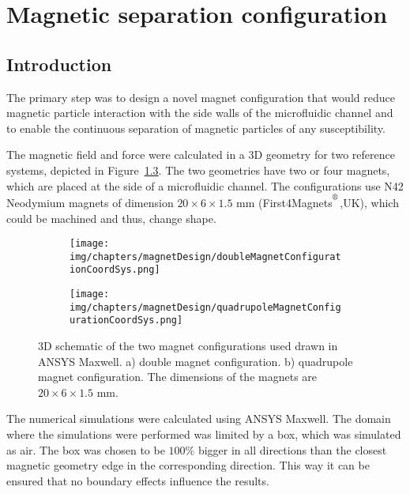 \chapter{Magnetic separation configuration}\label{ch:magneticSeparationConfiguration}

\section{Introduction}\label{sec:introduction}
The primary step was to design a novel magnet configuration that would reduce magnetic particle interaction with the side walls of the microfluidic channel and to enable the continuous separation of magnetic particles of any susceptibility. 

The magnetic field and force were calculated in a 3D geometry for two reference systems, depicted in Figure~\ref{fig:magnetConfigurations}. The two  geometries have two or four magnets, which are placed at the side of a microfluidic channel. The configurations use N42 Neodymium magnets of dimension $20\times 6\times 1.5$ mm (First4Magnets$^\textsuperscript{\textregistered}$,UK), which could be machined and thus, change shape.

\begin{figure}[htb]
\centering
	\begin{subfigure}[b]{0.48\textwidth}
		\texttt{[image: img/chapters/magnetDesign/doubleMagnetConfigurationCoordSys.png]}
		\caption{}
		\label{fig:double}
    \end{subfigure}
	\begin{subfigure}[b]{0.48\textwidth}
		\texttt{[image: img/chapters/magnetDesign/quadrupoleMagnetConfigurationCoordSys.png]}
		\caption{}
		\label{fig:quadrupole}
	\end{subfigure}
\caption[3D Schematic of the two magnet configurations]{3D schematic of the two magnet configurations used drawn in ANSYS Maxwell. a) double magnet configuration. b) quadrupole magnet configuration. The dimensions of the magnets are $20\times 6\times 1.5$ mm.}%
\label{fig:magnetConfigurations}
\end{figure}

The numerical simulations were calculated using ANSYS Maxwell. The domain where the simulations were performed was limited by a box, which was simulated as air. The box was chosen to be $100\%$ bigger in all directions than the closest magnetic geometry edge in the corresponding direction. This way it can be ensured that no boundary effects influence the results. 

